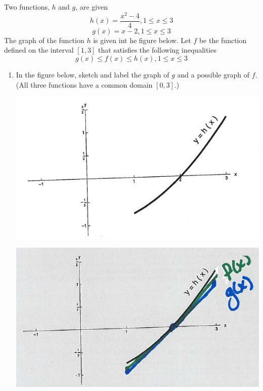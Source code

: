 \documentclass[nooutcomes]{ximera}
\begin{document}
\begin{problem}
	Two functions, $h$ and $g$, are given
	\[
	h(x)=\frac{x^2-4}{4},  1 \le x \le 3
	\]
	\[
	g(x)=x-2,  1 \le x \le 3
	\]
The graph of the function $h$ is given int he figure below.  
Let $f$ be the function defined on the interval $[1,3]$ that satisfies the following inequalities
	\[
	g(x) \le f(x) \le h(x), 1 \le x \le 3
	\]

	\begin{enumerate}
	
	\item In the figure below, sketch and label the graph of $g$ and a possible graph of $f$.  (All three functions have a common domain $[0,3]$.)

	\begin{image}
	\includegraphics{Figure1}
	\end{image}
	
	\begin{freeResponse}	
	\begin{image}
	\includegraphics{Figure2}
	\end{image}
	\end{freeResponse}


\end{enumerate}
\end{problem}
\end{document}
